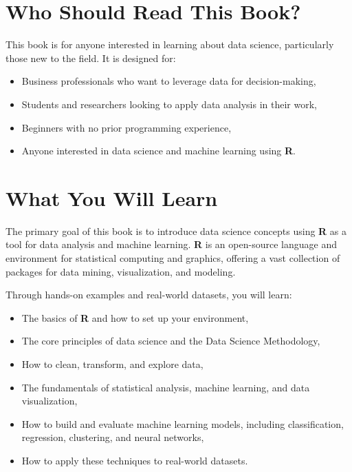 \documentclass[
]{book}
\providecommand{\tightlist}{%
  \setlength{\itemsep}{0pt}\setlength{\parskip}{0pt}}
\theoremstyle{definition}
\theoremstyle{definition}
\theoremstyle{definition}
\theoremstyle{definition}
\theoremstyle{remark}
\begin{document}
\section*{Who Should Read This Book?}\label{who-should-read-this-book}

This book is for anyone interested in learning about data science, particularly those new to the field. It is designed for:

\begin{itemize}
\tightlist
\item
  Business professionals who want to leverage data for decision-making,\\
\item
  Students and researchers looking to apply data analysis in their work,\\
\item
  Beginners with no prior programming experience,\\
\item
  Anyone interested in data science and machine learning using \textbf{R}.
\end{itemize}

\section*{What You Will Learn}\label{what-you-will-learn}

The primary goal of this book is to introduce data science concepts using \textbf{R} as a tool for data analysis and machine learning. \textbf{R} is an open-source language and environment for statistical computing and graphics, offering a vast collection of packages for data mining, visualization, and modeling.

Through hands-on examples and real-world datasets, you will learn:

\begin{itemize}
\tightlist
\item
  The basics of \textbf{R} and how to set up your environment,\\
\item
  The core principles of data science and the Data Science Methodology,\\
\item
  How to clean, transform, and explore data,\\
\item
  The fundamentals of statistical analysis, machine learning, and data visualization,\\
\item
  How to build and evaluate machine learning models, including classification, regression, clustering, and neural networks,\\
\item
  How to apply these techniques to real-world datasets.
\end{itemize}
\end{document}
